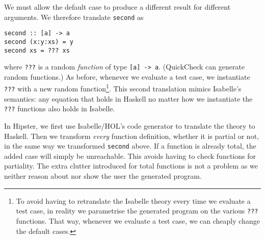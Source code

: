 We must allow the default case to produce a different result for
different arguments. We therefore translate \verb|second| as
\begin{verbatim}
second :: [a] -> a
second (x:y:xs) = y
second xs = ??? xs
\end{verbatim}
where \verb|???| is a random \emph{function} of type \verb|[a] -> a|.
(QuickCheck can generate random functions.) As before, whenever we
evaluate a test case, we instantiate \verb|???| with a new random
function\footnote{To avoid having to retranslate the Isabelle theory
every time we evaluate a test case, in reality we parametrise the
generated program on the various \texttt{???} functions. That way,
whenever we evaluate a test case, we can cheaply change the default cases.}.
This second translation mimics Isabelle's semantics: any equation that
holds in Haskell no matter how we instantiate the \verb|???| functions
also holds in Isabelle.

In Hipster, we first use Isabelle/HOL's code generator to translate the
theory to Haskell. Then we transform \emph{every} function definition, whether it is
partial or not, in the same way we transformed \verb|second| above.
If a function is already total, the added case will
simply be unreachable. This avoids having to check functions for partiality.
The extra clutter introduced for total functions is not a problem as we neither reason about nor show the user the generated program.
  
